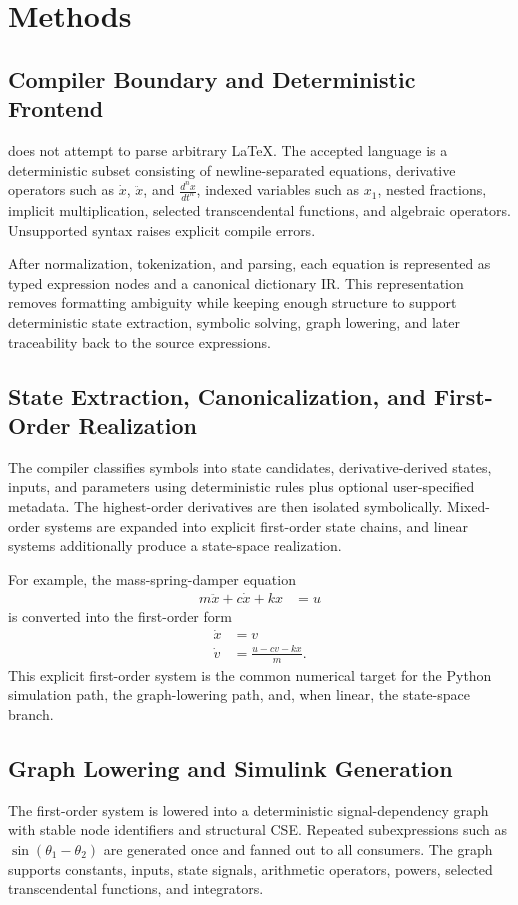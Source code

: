 \documentclass[colorlinks,upint,subscriptcorrection,varvw,balance,nofoot]{asmeconf}
\newcommand{\EqnToSim}{\NoCaseChange{Eqn2Sim}}
\begin{document}
\section{Methods}
\subsection{Compiler Boundary and Deterministic Frontend}
\EqnToSim{} does not attempt to parse arbitrary \LaTeX. The accepted language is a deterministic subset consisting of newline-separated equations, derivative operators such as $\dot{x}$, $\ddot{x}$, and $\frac{d^n x}{dt^n}$, indexed variables such as $x_1$, nested fractions, implicit multiplication, selected transcendental functions, and algebraic operators. Unsupported syntax raises explicit compile errors.

After normalization, tokenization, and parsing, each equation is represented as typed expression nodes and a canonical dictionary IR. This representation removes formatting ambiguity while keeping enough structure to support deterministic state extraction, symbolic solving, graph lowering, and later traceability back to the source expressions.

\subsection{State Extraction, Canonicalization, and First-Order Realization}
The compiler classifies symbols into state candidates, derivative-derived states, inputs, and parameters using deterministic rules plus optional user-specified metadata. The highest-order derivatives are then isolated symbolically. Mixed-order systems are expanded into explicit first-order state chains, and linear systems additionally produce a state-space realization.

For example, the mass-spring-damper equation
\begin{align}
  m\ddot{x} + c\dot{x} + kx &= u
\end{align}
is converted into the first-order form
\begin{align}
  \dot{x} &= v \\
  \dot{v} &= \frac{u - cv - kx}{m}.
  \label{eq:massspring_first_order}
\end{align}
This explicit first-order system is the common numerical target for the Python simulation path, the graph-lowering path, and, when linear, the state-space branch.

\subsection{Graph Lowering and Simulink Generation}
The first-order system is lowered into a deterministic signal-dependency graph with stable node identifiers and structural CSE. Repeated subexpressions such as $\sin(\theta_1-\theta_2)$ are generated once and fanned out to all consumers. The graph supports constants, inputs, state signals, arithmetic operators, powers, selected transcendental functions, and integrators.
\end{document}
